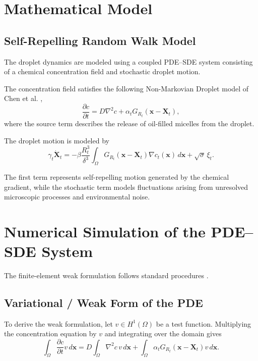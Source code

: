 \section{Mathematical Model}

\subsection{Self-Repelling Random Walk Model}

The droplet dynamics are modeled using a coupled PDE--SDE system\cite{droplet2025} consisting of a chemical concentration field and stochastic droplet motion.

The concentration field satisfies the following  Non-Markovian Droplet model of Chen et al.
\cite{droplet2025},
\begin{equation}
\frac{\partial c}{\partial t}
=
D\nabla^2 c
+
\alpha_t G_{R_t}(\mathbf{x}-\mathbf{X}_t),
\end{equation}
where the source term describes the release of oil-filled micelles from the droplet.

The droplet motion is modeled by\cite{droplet2025}
\begin{equation}
\gamma_t \dot{\mathbf{X}}_t
=
-\beta\frac{R_t^3}{\delta^3}
\int_{\Omega}
G_{R_t}(\mathbf{x}-\mathbf{X}_t)
\nabla c_t(\mathbf{x})\,d\mathbf{x}
+
\sqrt{\sigma}\,\xi_t.
\end{equation}

The first term represents self-repelling motion generated by the chemical gradient, while the stochastic term models fluctuations arising from unresolved microscopic processes and environmental noise.

\section{Numerical Simulation of the PDE--SDE System}
The finite-element weak formulation follows standard procedures
\cite{fenics2016}.
\subsection{Variational / Weak Form of the PDE}

To derive the weak formulation, let \(v\in H^1(\Omega)\) be a test function. Multiplying the concentration equation by \(v\) and integrating over the domain gives
\begin{equation}
\int_{\Omega}
\frac{\partial c}{\partial t}v\,d\mathbf{x}
=
D\int_{\Omega}
\nabla^2 c\,v\,d\mathbf{x}
+
\int_{\Omega}
\alpha_t
G_{R_t}(\mathbf{x}-\mathbf{X}_t)
v\,d\mathbf{x}.
\end{equation}

